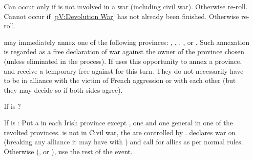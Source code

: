 
\condition{}
\aparag Can occur only if \FRA is not involved in a war (including civil
war). Otherwise re-roll.
\aparag Cannot occur if \ref{pV:Devolution War} has not already been
finished. Otherwise re-roll.

\phevnt
\aparag \FRA may immediately annex one of the following provinces:
\provincePicardie, \provinceRosselo, ,
\provinceLuxemburg, \provinceAlsace or \provinceLorraine.  Such annexation is
regarded as a free declaration of war against the owner of the province chosen
(unless eliminated in the process).
\aparag If \FRA uses this opportunity to annex a province, \HOL and \ENG
receive a temporary free \CB against \FRA for this turn. They do not
necessarily have to be in alliance with the victim of French aggression or
with each other (but they may decide so if both sides agree).





\condition{}
\begin{todo}
  If \ANG is \CATHCR?
\end{todo}
\aparag If \ENG is \PROTRIG:
\bparag Put a \REVOLT \facemoins in each Irish province except \provinceUladh,
one \LD and one general in one of the revolted provinces. \ENG is not in Civil
war, the \REVOLT are controlled by \HOL.
\bparag \paysEcosse declares war on \ANG (breaking any alliance it may have
with \ANG) and call for allies as per normal rules.
\aparag Otherwise (\CATHCR, \CATHCO or \PROTANG), use the rest of the event.

